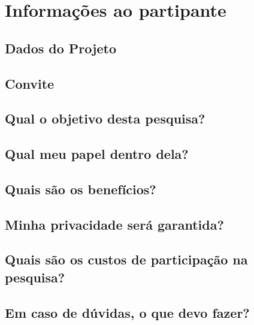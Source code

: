 \chapter{Informações ao partipante}
\label{ape:informacoes-participante}

\section{Dados do Projeto}

\section{Convite}

\section{Qual o objetivo desta pesquisa?}

\section{Qual meu papel dentro dela?}

\section{Quais são os benefícios?}

\section{Minha privacidade será garantida?}

\section{Quais são os custos de participação na pesquisa?}

\section{Em caso de dúvidas, o que devo fazer?}


